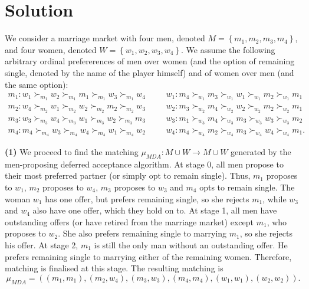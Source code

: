\documentclass[a4paper]{article}
\begin{document}
\section*{Solution}
	We consider a marriage market with four men, denoted
	$M=\left\{ m_{1},m_{2},m_{3},m_{4}\right\} $, and four women, denoted
	$W=\left\{ w_{1},w_{2},w_{3},w_{4}\right\} $. We assume the following
	arbitrary ordinal prefererences of men over women (and the option
	of remaining single, denoted by the name of the player himself) and
	of women over men (and the same option):
	\begin{align*}
		m_{1}:w_{1}\succ_{m_{1}}w_{2}\succ_{m_{1}}m_{1}\succ_{m_{1}}w_{3}\succ_{m_{1}}w_{4}\;\;\; & \;\;\;w_{1}:m_{4}\succ_{w_{1}}m_{3}\succ_{w_{1}}w_{1}\succ_{w_{1}}m_{2}\succ_{w_{1}}m_{1}\\
		m_{2}:w_{4}\succ_{m_{2}}w_{1}\succ_{m_{2}}w_{2}\succ_{m_{2}}m_{2}\succ_{m_{2}}w_{3}\;\;\; & \;\;\;w_{2}:m_{3}\succ_{w_{2}}m_{4}\succ_{w_{2}}w_{2}\succ_{w_{2}}m_{2}\succ_{w_{2}}m_{1}\\
		m_{3}:w_{3}\succ_{m_{3}}w_{4}\succ_{m_{3}}w_{1}\succ_{m_{3}}w_{2}\succ_{m_{3}}m_{3}\;\;\; & \;\;\;w_{3}:m_{1}\succ_{w_{3}}m_{4}\succ_{w_{3}}m_{3}\succ_{w_{3}}w_{3}\succ_{w_{3}}m_{2}\\
		m_{4}:m_{4}\succ_{m_{4}}w_{3}\succ_{m_{4}}w_{4}\succ_{m_{4}}w_{1}\succ_{m_{4}}w_{2}\;\;\; & \;\;\;w_{4}:m_{4}\succ_{w_{4}}m_{2}\succ_{w_{4}}m_{3}\succ_{w_{4}}w_{4}\succ_{w_{4}}m_{1}.
	\end{align*}
	
	\textbf{(1)} We proceed to find the matching $\mu_{MDA}:M\cup W\rightarrow M\cup W$
	generated by the men-proposing deferred acceptance algorithm. At stage
	0, all men propose to their most preferred partner (or simply opt
	to remain single). Thus, $m_{1}$ proposes to $w_{1}$, $m_{2}$ proposes
	to $w_{4}$, $m_{3}$ proposes to $w_{3}$ and $m_{4}$ opts to remain
	single. The woman $w_{1}$ has one offer, but prefers remaining single,
	so she rejects $m_{1}$, while $w_{3}$ and $w_{4}$ also have one
	offer, which they hold on to. At stage 1, all men have outstanding
	offers (or have retired from the marriage market) except $m_{1}$,
	who proposes to $w_{2}$. She also prefers remaining single to marrying
	$m_{1}$, so she rejects his offer. At stage 2, $m_{1}$ is still
	the only man without an outstanding offer. He prefers remaining single
	to marrying either of the remaining women. Therefore, matching is
	finalised at this stage. The resulting matching is
	\[
	\mu_{MDA}=\left(\left(m_{1},m_{1}\right),\left(m_{2},w_{4}\right),\left(m_{3},w_{3}\right),\left(m_{4},m_{4}\right),\left(w_{1},w_{1}\right),\left(w_{2},w_{2}\right)\right).
	\]
	
\end{document}
